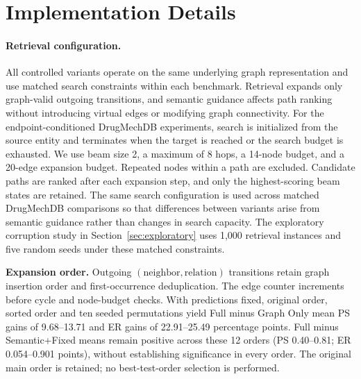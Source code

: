 \documentclass{article} %
\newcommand{\rev}[1]{{\color{blue}#1}}
\begin{document}
\section{Implementation Details}
\label{app:implementation}

\paragraph{Retrieval configuration.}
All controlled variants operate on the same underlying graph representation and
use matched search constraints within each benchmark. Retrieval expands only
graph-valid outgoing transitions, and semantic guidance affects path ranking
without introducing virtual edges or modifying graph connectivity. For the
endpoint-conditioned DrugMechDB experiments, search is initialized from the
source entity and terminates when the target is reached or the search budget is
exhausted. We use beam size 2, a maximum of 8 hops, a 14-node budget, and a
20-edge expansion budget. Repeated nodes within a path are excluded. Candidate
paths are ranked after each expansion step, and only the highest-scoring beam
states are retained. The same search configuration is used across matched
DrugMechDB comparisons so that differences between variants arise from semantic
guidance rather than changes in search capacity.
The exploratory corruption study in Section~\ref{sec:exploratory} uses 1,000
retrieval instances and five random seeds under these matched constraints.

\noindent\textbf{Expansion order.} Outgoing $(\mathrm{neighbor},\mathrm{relation})$ transitions retain graph insertion order and first-occurrence deduplication. The edge counter increments before cycle and node-budget checks. With predictions fixed, original order, sorted order and ten seeded permutations yield Full minus Graph Only \rev{mean PS gains of 9.68--13.71 and ER gains of 22.91--25.49 percentage points. Full minus Semantic+Fixed means remain positive across these 12 orders (PS 0.40--0.81; ER 0.054--0.901 points), without establishing significance in every order.} The original main order is retained; no best-test-order selection is performed.
\end{document}
